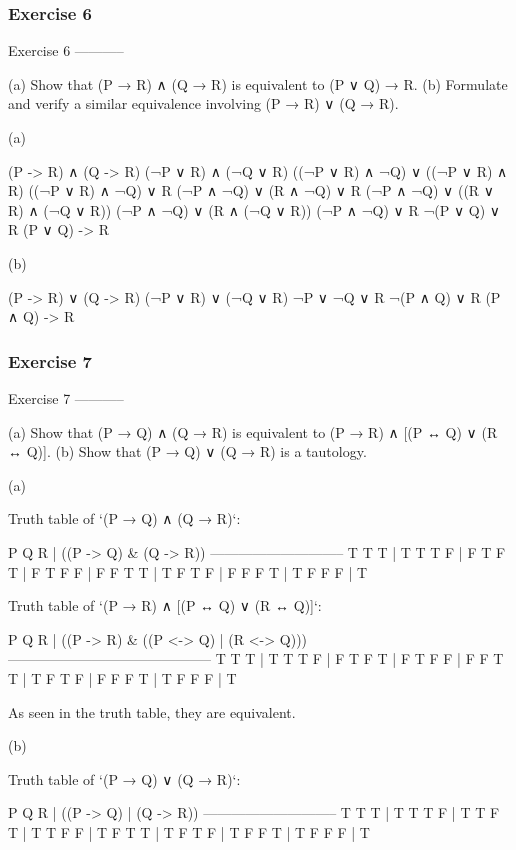 \subsubsection{Exercise 6}
Exercise 6
-----------

    (a) Show that (P → R) ∧ (Q → R) is equivalent to (P ∨ Q) → R.
    (b) Formulate and verify a similar equivalence involving (P → R) ∨
    (Q → R).

(a)

    (P -> R) ∧ (Q -> R)
    (¬P ∨ R) ∧ (¬Q ∨ R)
    ((¬P ∨ R) ∧ ¬Q) ∨ ((¬P ∨ R) ∧ R)
    ((¬P ∨ R) ∧ ¬Q) ∨ R
    (¬P ∧ ¬Q) ∨ (R ∧ ¬Q) ∨ R
    (¬P ∧ ¬Q) ∨ ((R ∨ R) ∧ (¬Q ∨ R))
    (¬P ∧ ¬Q) ∨ (R ∧ (¬Q ∨ R))
    (¬P ∧ ¬Q) ∨ R
    ¬(P ∨ Q) ∨ R
    (P ∨ Q) -> R

(b)

    (P -> R) ∨ (Q -> R)
    (¬P ∨ R) ∨ (¬Q ∨ R)
    ¬P ∨ ¬Q ∨ R
    ¬(P ∧ Q) ∨ R
    (P ∧ Q) -> R

\subsubsection{Exercise 7}
Exercise 7
-----------

    (a) Show that (P → Q) ∧ (Q → R) is equivalent to (P → R) ∧
    [(P ↔ Q) ∨ (R ↔ Q)].
    (b) Show that (P → Q) ∨ (Q → R) is a tautology.

(a)

Truth table of `(P → Q) ∧ (Q → R)`:

    P Q R | ((P -> Q) & (Q -> R))
    -----------------------------
    T T T | T
    T T F | F
    T F T | F
    T F F | F
    F T T | T
    F T F | F
    F F T | T
    F F F | T

Truth table of `(P → R) ∧ [(P ↔ Q) ∨ (R ↔ Q)]`:

    P Q R | ((P -> R) & ((P <-> Q) | (R <-> Q)))
    --------------------------------------------
    T T T | T
    T T F | F
    T F T | F
    T F F | F
    F T T | T
    F T F | F
    F F T | T
    F F F | T

As seen in the truth table, they are equivalent.

(b)

Truth table of `(P → Q) ∨ (Q → R)`:

    P Q R | ((P -> Q) | (Q -> R))
    -----------------------------
    T T T | T
    T T F | T
    T F T | T
    T F F | T
    F T T | T
    F T F | T
    F F T | T
    F F F | T

